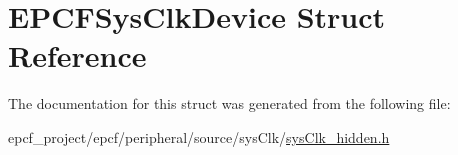 \hypertarget{structEPCFSysClkDevice}{}\section{E\+P\+C\+F\+Sys\+Clk\+Device Struct Reference}
\label{structEPCFSysClkDevice}


The documentation for this struct was generated from the following file\+:\begin{DoxyCompactItemize}
\item 
epcf\+\_\+project/epcf/peripheral/source/sys\+Clk/\mbox{\hyperlink{sysClk__hidden_8h}{sys\+Clk\+\_\+hidden.\+h}}\end{DoxyCompactItemize}
